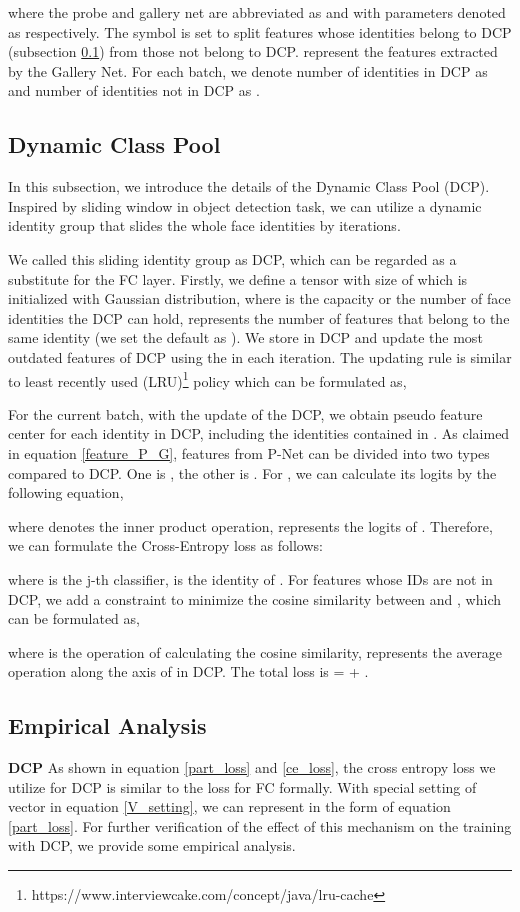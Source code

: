 where the probe and gallery net are abbreviated as  and  with parameters denoted as  respectively. 
The symbol  is set to split features whose identities belong to DCP (subsection \ref{DCP_sec}) from those not belong to DCP.
 represent the features extracted by the Gallery Net.
For each batch, we denote number of identities in DCP as  and number of identities not in DCP as .

\subsection{Dynamic Class Pool}\label{DCP_sec}
In this subsection, we introduce the details of the Dynamic Class Pool (DCP). 
Inspired by sliding window \cite{lampert2008beyond} in object detection task, we can utilize a dynamic identity group that slides the whole face identities by iterations.

We called this sliding identity group as DCP, which can be regarded as a substitute for the FC layer.
Firstly, we define a tensor  with size of  which is initialized with Gaussian distribution,
where  is the capacity or the number of face identities the DCP can hold,
 represents the number of features that belong to the same identity (we set the default as ).
We store  in DCP and update the most outdated features of DCP using the  in each iteration.
The updating rule is similar to least recently used (LRU)\footnote{https://www.interviewcake.com/concept/java/lru-cache} policy which can be formulated as,

For the current batch, with the update of the DCP, we obtain pseudo feature center for each identity in DCP, including the identities contained in .
As claimed in equation \ref{feature_P_G}, features from P-Net can be divided into two types compared to DCP.
One is , the other is .
For , we can calculate its logits by the following equation,

where  denotes the inner product operation,  represents the logits of .
Therefore, we can formulate the Cross-Entropy loss as follows:

where  is the j-th classifier,  is the identity of .
For features  whose IDs are not in DCP, we add a constraint to minimize the cosine similarity between  and , which can be formulated as,

where  is the operation of calculating the cosine similarity,  represents the average operation along the axis of  in DCP. 
The total loss is  =  + .


\subsection{Empirical Analysis}
\textbf{DCP}
As shown in equation \ref{part_loss} and \ref{ce_loss}, the cross entropy loss we utilize for DCP is similar to the loss for FC formally.
With special setting of vector  in equation \ref{V_setting}, we can represent  in the form of equation \ref{part_loss}. 
For further verification of the effect of this mechanism on the training with DCP, we provide some empirical analysis.






